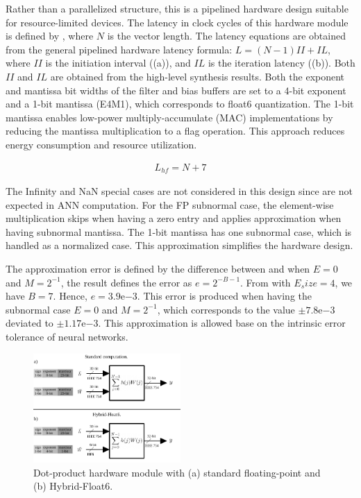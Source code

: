 Rather than a parallelized structure, this is a pipelined hardware design suitable for resource-limited devices. The latency in clock cycles of this hardware module is defined by , where $N$ is the vector length. The latency equations are obtained from the general pipelined hardware latency formula: $L=\left(N-1\right)II+IL$, where $II$ is the initiation interval ((a)), and $IL$ is the iteration latency ((b)). Both $II$ and $IL$ are obtained from the high-level synthesis results. Both the exponent and mantissa bit widths of the filter and bias buffers are set to a 4-bit exponent and a 1-bit mantissa (E4M1), which corresponds to float6 quantization. The 1-bit mantissa enables low-power multiply-accumulate (MAC) implementations by reducing the mantissa multiplication to a flag operation. This approach reduces energy consumption and resource utilization.

\begin{eqnarray} \label{eq:dot_custom_float_latency}
L_{hf}=N+7
\end{eqnarray}

The Infinity and NaN special cases are not considered in this design since are not expected in ANN computation. For the FP subnormal case, the element-wise multiplication skips when having a zero entry and applies approximation when having subnormal mantissa. The 1-bit mantissa has one subnormal case, which is handled as a normalized case. This approximation simplifies the hardware design.

The approximation error is defined by the difference between  and  when $E=0$ and $M=2^{-1}$, the result defines the error as $e=2^{-B-1}$. From  with $E_size=4$, we have $B=7$. Hence, $e=3.9\mathrm{e}{-3}$. This error is produced when having the subnormal case $E=0$ and $M=2^{-1}$, which corresponds to the value $\pm7.8\mathrm{e}{-3}$ deviated to $\pm1.17\mathrm{e}{-3}$. This approximation is allowed base on the intrinsic error tolerance of neural networks\cite{du2014leveraging}.

\begin{figure}[t!]
	\centering
	\includegraphics[width=0.5\textwidth]{../figures/dot-product_unit.pdf}
	\caption{Dot-product hardware module with (a) standard floating-point and (b) Hybrid-Float6.}
	\label{fig:dot_product}
\end{figure}

